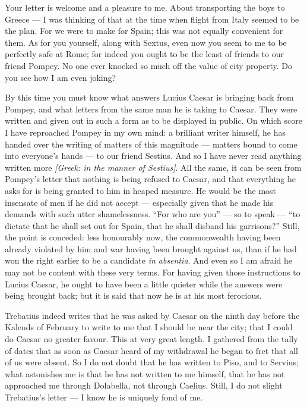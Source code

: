 

 Your letter is welcome and a pleasure to me. About transporting the boys to Greece --- I was thinking of that at the time when flight from Italy seemed to be the plan. For we were to make for Spain; this was not equally convenient for them. As for you yourself, along with Sextus, even now you seem to me to be perfectly safe at Rome; for indeed you ought to be the least of friends to our friend Pompey. No one ever knocked so much off the value of city property. Do you see how I am even joking?

 By this time you must know what answers Lucius Caesar is bringing back from Pompey, and what letters from the same man he is taking to Caesar. They were written and given out in such a form as to be displayed in public. On which score I have reproached Pompey in my own mind: a brilliant writer himself, he has handed over the writing of matters of this magnitude --- matters bound to come into everyone's hands --- to our friend Sestius. And so I have never read anything written more \textit{[Greek: in the manner of Sestius]}. All the same, it can be seen from Pompey's letter that nothing is being refused to Caesar, and that everything he asks for is being granted to him in heaped measure. He would be the most insensate of men if he did not accept --- especially given that he made his demands with such utter shamelessness. ``For who are you'' --- so to speak --- ``to dictate that he shall set out for Spain, that he shall disband his garrisons?'' Still, the point is conceded: less honourably now, the commonwealth having been already violated by him and war having been brought against us, than if he had won the right earlier to be a candidate \emph{in absentia}. And even so I am afraid he may not be content with these very terms. For having given those instructions to Lucius Caesar, he ought to have been a little quieter while the answers were being brought back; but it is said that now he is at his most ferocious.

 Trebatius indeed writes that he was asked by Caesar on the ninth day before the Kalends of February to write to me that I should be near the city; that I could do Caesar no greater favour. This at very great length. I gathered from the tally of dates that as soon as Caesar heard of my withdrawal he began to fret that all of us were absent. So I do not doubt that he has written to Piso, and to Servius; what astonishes me is that he has not written to me himself, that he has not approached me through Dolabella, not through Caelius. Still, I do not slight Trebatius's letter --- I know he is uniquely fond of me.

